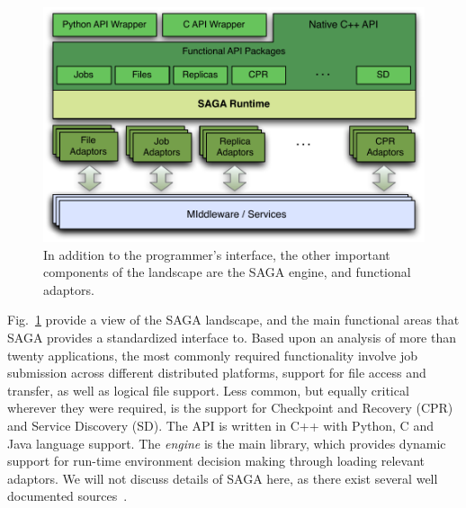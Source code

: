 \documentclass[conference,final]{IEEEtran}
\begin{document}
\begin{figure}[t]
\includegraphics[scale=0.5]{saga-figure02.pdf}
\caption{In addition to the programmer's interface,
  the other important components of the landscape are the SAGA engine,
  and functional adaptors.}
\label{saga_figure}
\end{figure}

Fig.~\ref{saga_figure} provide a view of the SAGA landscape, and the
main functional areas that SAGA provides a standardized interface
to. Based upon an analysis of more than twenty applications, the most
commonly required functionality involve job submission across
different distributed platforms, support for file access and transfer,
as well as logical file support. Less common, but equally critical
wherever they were required, is the support for Checkpoint and
Recovery (CPR) and Service Discovery (SD).  The API is written in C++
with Python, C and Java language support. The {\it engine} is the main
library, which provides dynamic support for run-time environment
decision making through loading relevant adaptors. We will not discuss
details of SAGA here, as there exist several well documented
sources~\cite{saga_url}.




\end{document}
